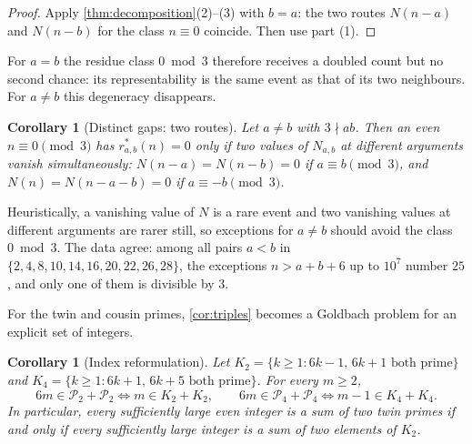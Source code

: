 \documentclass[11pt]{amsart}
\newtheorem{corollary}[theorem]{Corollary}
\theoremstyle{definition}
\theoremstyle{remark}
\newcommand{\PP}{\mathcal{P}}
\begin{document}
\begin{proof}
Apply \cref{thm:decomposition}(2)--(3) with $b=a$: the two routes $N(n-a)$ and $N(n-b)$ for the class $n\equiv 0$ coincide. Then use part (1).
\end{proof}

For $a=b$ the residue class $0\bmod 3$ therefore receives a doubled count but no second chance: its representability is the same event as that of its two neighbours. For $a\ne b$ this degeneracy disappears.

\begin{corollary}[Distinct gaps: two routes]\label{cor:mixed}
Let $a\neq b$ with $3\nmid ab$. Then an even $n\equiv 0\pmod 3$ has $r^*_{a,b}(n)=0$ only if two values of $N_{a,b}$ at different arguments vanish simultaneously: $N(n-a)=N(n-b)=0$ if $a\equiv b\pmod 3$, and $N(n)=N(n-a-b)=0$ if $a\equiv -b\pmod 3$.
\end{corollary}

Heuristically, a vanishing value of $N$ is a rare event and two vanishing values at different arguments are rarer still, so exceptions for $a\neq b$ should avoid the class $0\bmod 3$. The data agree: among all pairs $a<b$ in $\{2,4,8,10,14,16,20,22,26,28\}$, the exceptions $n>a+b+6$ up to $10^7$ number $25$, and only one of them is divisible by $3$.

For the twin and cousin primes, \cref{cor:triples} becomes a Goldbach problem for an explicit set of integers.

\begin{corollary}[Index reformulation]\label{cor:index}
Let $K_2=\{k\ge1: 6k-1,\,6k+1 \text{ both prime}\}$ and $K_4=\{k\ge1: 6k+1,\,6k+5 \text{ both prime}\}$. For every $m\ge 2$,
\[
6m\in\PP_2+\PP_2 \iff m\in K_2+K_2,
\qquad
6m\in\PP_4+\PP_4 \iff m-1\in K_4+K_4 .
\]
In particular, every sufficiently large even integer is a sum of two twin primes if and only if every sufficiently large integer is a sum of two elements of $K_2$.
\end{corollary}
\end{document}
